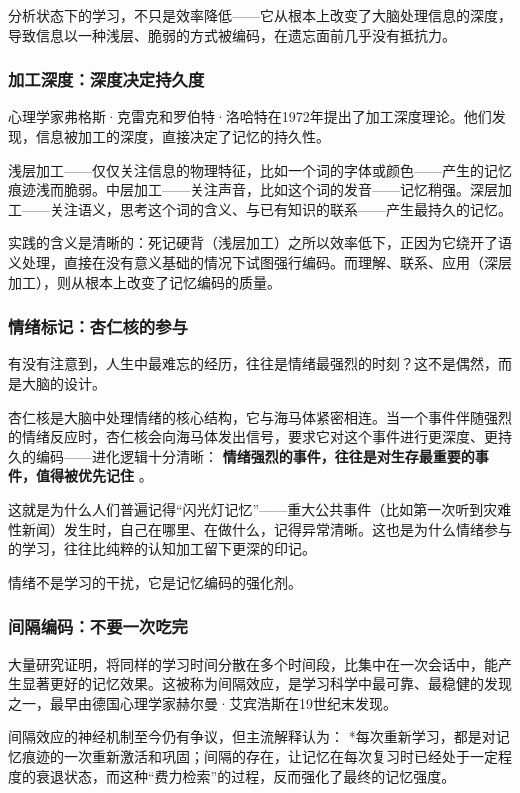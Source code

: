 \documentclass[11pt]{article}
\begin{document}
分析状态下的学习，不只是效率降低——它从根本上改变了大脑处理信息的深度，导致信息以一种浅层、脆弱的方式被编码，在遗忘面前几乎没有抵抗力。
\subsubsection{加工深度：深度决定持久度}
\label{sec:orgeb8cab1}

心理学家弗格斯·克雷克和罗伯特·洛哈特在1972年提出了加工深度理论。他们发现，信息被加工的深度，直接决定了记忆的持久性。

浅层加工——仅仅关注信息的物理特征，比如一个词的字体或颜色——产生的记忆痕迹浅而脆弱。中层加工——关注声音，比如这个词的发音——记忆稍强。深层加工——关注语义，思考这个词的含义、与已有知识的联系——产生最持久的记忆。

实践的含义是清晰的：死记硬背（浅层加工）之所以效率低下，正因为它绕开了语义处理，直接在没有意义基础的情况下试图强行编码。而理解、联系、应用（深层加工），则从根本上改变了记忆编码的质量。
\subsubsection{情绪标记：杏仁核的参与}
\label{sec:org02bf399}

有没有注意到，人生中最难忘的经历，往往是情绪最强烈的时刻？这不是偶然，而是大脑的设计。

杏仁核是大脑中处理情绪的核心结构，它与海马体紧密相连。当一个事件伴随强烈的情绪反应时，杏仁核会向海马体发出信号，要求它对这个事件进行更深度、更持久的编码——进化逻辑十分清晰： \textbf{情绪强烈的事件，往往是对生存最重要的事件，值得被优先记住} 。

这就是为什么人们普遍记得“闪光灯记忆”——重大公共事件（比如第一次听到灾难性新闻）发生时，自己在哪里、在做什么，记得异常清晰。这也是为什么情绪参与的学习，往往比纯粹的认知加工留下更深的印记。

情绪不是学习的干扰，它是记忆编码的强化剂。
\subsubsection{间隔编码：不要一次吃完}
\label{sec:orgc1dcd5a}

大量研究证明，将同样的学习时间分散在多个时间段，比集中在一次会话中，能产生显著更好的记忆效果。这被称为间隔效应，是学习科学中最可靠、最稳健的发现之一，最早由德国心理学家赫尔曼·艾宾浩斯在19世纪末发现。

间隔效应的神经机制至今仍有争议，但主流解释认为： *每次重新学习，都是对记忆痕迹的一次重新激活和巩固；间隔的存在，让记忆在每次复习时已经处于一定程度的衰退状态，而这种“费力检索”的过程，反而强化了最终的记忆强度。
\end{document}
